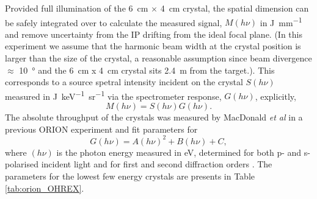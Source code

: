 Provided full illumination of the \qty{6}{cm} $\times$ \qty{4}{cm} crystal, the spatial dimension can be safely integrated over to calculate the measured signal, $M(h\nu)$ in \unit{J.mm^{-1}} and remove uncertainty from the IP drifting from the ideal focal plane. (In this experiment we assume that the harmonic beam width at the crystal position is larger than the size of the crystal, a reasonable assumption since beam divergence $\approx$ \qty{10}{\degree} and the \qty{6}{cm} x \qty{4}{cm} crystal sits \qty{2.4}{m} from the target.). This corresponds to a source spetral intensity incident on the crystal $S(h\nu)$ measured in \unit{J.keV^{-1}.sr^{-1}} via the spectrometer response, $G(h\nu)$, explicitly,
\begin{equation}
	M(h\nu) = S(h\nu)G(h\nu).
\end{equation}
The absolute throughput of the crystals was measured by MacDonald \textit{et al} in a previous ORION experiment and fit parameters for 
\begin{equation}
	G(h\nu) = A(h\nu)^2 + B(h\nu) + C,
\end{equation}
where $(h\nu)$ is the photon energy measured in eV, determined for both p- and s-polarised incident light and for first and second diffraction orders \cite{macdonaldAbsoluteThroughputCalibration2021}. The parameters for the lowest few energy crystals are presents in Table \ref{tab:orion_OHREX}.
